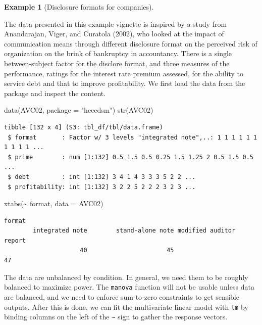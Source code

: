 \documentclass[
  11pt,
  letterpaper,
]{scrbook}
\newenvironment{Shaded}{\begin{snugshade}}{\end{snugshade}}
\newcommand{\AttributeTok}[1]{\textcolor[rgb]{0.40,0.45,0.13}{#1}}
\newcommand{\FunctionTok}[1]{\textcolor[rgb]{0.28,0.35,0.67}{#1}}
\newcommand{\NormalTok}[1]{\textcolor[rgb]{0.00,0.23,0.31}{#1}}
\newcommand{\SpecialCharTok}[1]{\textcolor[rgb]{0.37,0.37,0.37}{#1}}
\newcommand{\StringTok}[1]{\textcolor[rgb]{0.13,0.47,0.30}{#1}}
\theoremstyle{definition}
\theoremstyle{definition}
\newtheorem{example}{Example}[chapter]
\theoremstyle{remark}
\begin{document}
\begin{example}[Disclosure formats for
companies]\protect\hypertarget{exm-avc}{}\label{exm-avc}

The data presented in this example vignette is inspired by a study from
Anandarajan, Viger, and Curatola (2002), who looked at the impact of
communication means through different disclosure format on the perceived
risk of organization on the brink of bankruptcy in accountancy. There is
a single between-subject factor for the disclore format, and three
measures of the performance, ratings for the interest rate premium
assessed, for the ability to service debt and that to improve
profitability. We first load the data from the package and inspect the
content.

\begin{Shaded}
\begin{Highlighting}[]
\FunctionTok{data}\NormalTok{(AVC02, }\AttributeTok{package =} \StringTok{"hecedsm"}\NormalTok{)}
\FunctionTok{str}\NormalTok{(AVC02)}
\end{Highlighting}
\end{Shaded}

\begin{verbatim}
tibble [132 x 4] (S3: tbl_df/tbl/data.frame)
 $ format       : Factor w/ 3 levels "integrated note",..: 1 1 1 1 1 1 1 1 1 1 ...
 $ prime        : num [1:132] 0.5 1.5 0.5 0.25 1.5 1.25 2 0.5 1.5 0.5 ...
 $ debt         : int [1:132] 3 4 1 4 3 3 3 5 2 2 ...
 $ profitability: int [1:132] 3 2 2 5 2 2 2 3 2 3 ...
\end{verbatim}

\begin{Shaded}
\begin{Highlighting}[]
\FunctionTok{xtabs}\NormalTok{(}\SpecialCharTok{\textasciitilde{}}\NormalTok{ format, }\AttributeTok{data =}\NormalTok{ AVC02)}
\end{Highlighting}
\end{Shaded}

\begin{verbatim}
format
        integrated note        stand-alone note modified auditor report 
                     40                      45                      47 
\end{verbatim}

The data are unbalanced by condition. In general, we need them to be
roughly balanced to maximize power. The \texttt{manova} function will
not be usable unless data are balanced, and we need to enforce
sum-to-zero constraints to get sensible outputs. After this is done, we
can fit the multivariate linear model with \texttt{lm} by binding
columns on the left of the \texttt{\textasciitilde{}} sign to gather the
response vectors.


\end{example}
\end{document}
